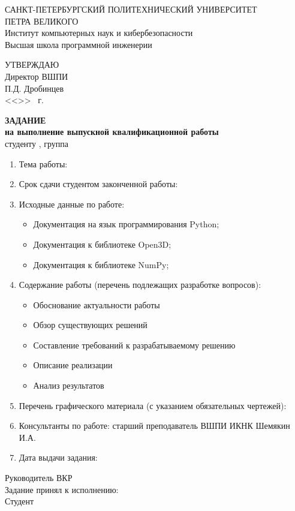 \begin{center}
  {САНКТ-ПЕТЕРБУРГСКИЙ ПОЛИТЕХНИЧЕСКИЙ УНИВЕРСИТЕТ\\ ПЕТРА ВЕЛИКОГО} \\
  {Институт компьютерных наук и кибербезопасности} \\
  {Высшая школа программной инженерии} \\

  {
  \begin{flushright}
    УТВЕРЖДАЮ\\
    Директор ВШПИ\\
    \underline{\hspace{2.2cm}} П.Д. Дробинцев\\
    <<\underline{\hspace*{0.05\textheight}}>> \underline{\hspace*{0.1\textheight}} \the\year{}~г. \\[1.8cm]
  \end{flushright}
  }

  \textbf{ЗАДАНИЕ} \\
  \textbf{на выполнение выпускной квалификационной работы}\\
  студенту \AuthorFull, группа \Group \\[0.5cm]
  \begin{enumerate}[label=\arabic*.]
    \item Тема работы: \Theme
    \item Срок сдачи студентом законченной работы: \TaskDeadline
    \item Исходные данные по работе:
      \begin{itemize}
        \item Документация на язык программирования Python;
        \item Документация к библиотеке Open3D;
        \item Документация к библиотеке NumPy;
      \end{itemize}
    \item Содержание работы (перечень подлежащих разработке вопросов):
      \begin{itemize}
        \item Обоснование актуальности работы
        \item Обзор существующих решений
        \item Составление требований к разрабатываемому решению
        \item Описание реализации
        \item Анализ результатов
      \end{itemize}
    \item Перечень графического материала (с указанием обязательных чертежей):
    \item Консультанты по работе: старший преподаватель ВШПИ ИКНК Шемякин И.А.
    \item Дата выдачи задания: \TaskCreatedCiframi
  \end{enumerate}
\end{center}
Руководитель ВКР \hspace{3.5cm} \underline{\hspace{5cm}} \hfill \Supervisor\\[0.5cm]
Задание принял к исполнению: \TaskCreatedCiframi\\[0.5cm]
Студент \hspace{5.8cm} \underline{\hspace{5cm}} \hfill \Author\\
